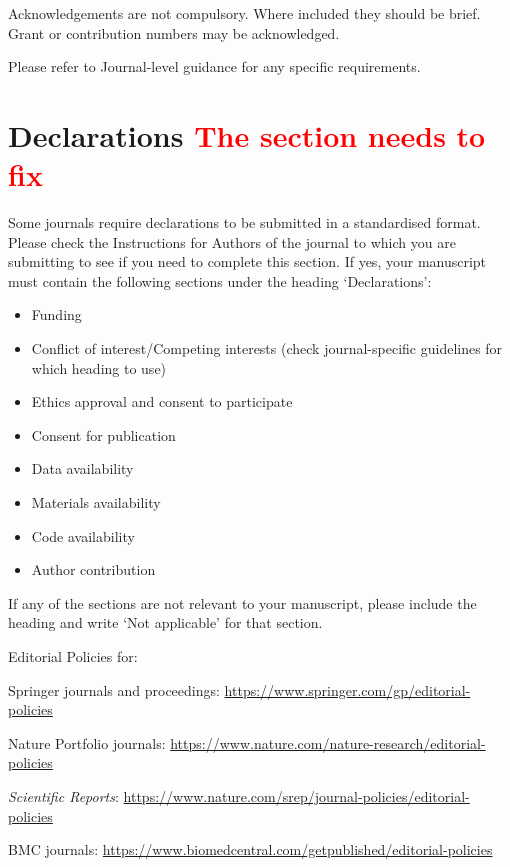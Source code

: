 \documentclass[pdflatex,sn-mathphys-num]{sn-jnl}%
\theoremstyle{thmstyleone}%
\theoremstyle{thmstyletwo}%
\theoremstyle{thmstylethree}%
\begin{document}
\newpage


Acknowledgements are not compulsory. Where included they should be brief. Grant or contribution numbers may be acknowledged.

Please refer to Journal-level guidance for any specific requirements.

\section*{Declarations \textcolor{red}{The section needs to fix}}

Some journals require declarations to be submitted in a standardised format. Please check the Instructions for Authors of the journal to which you are submitting to see if you need to complete this section. If yes, your manuscript must contain the following sections under the heading `Declarations':

\begin{itemize}
\item Funding
\item Conflict of interest/Competing interests (check journal-specific guidelines for which heading to use)
\item Ethics approval and consent to participate
\item Consent for publication
\item Data availability 
\item Materials availability
\item Code availability 
\item Author contribution
\end{itemize}

\noindent
If any of the sections are not relevant to your manuscript, please include the heading and write `Not applicable' for that section. 

\bigskip
\begin{flushleft}%
Editorial Policies for:

\bigskip\noindent
Springer journals and proceedings: \url{https://www.springer.com/gp/editorial-policies}

\bigskip\noindent
Nature Portfolio journals: \url{https://www.nature.com/nature-research/editorial-policies}

\bigskip\noindent
\textit{Scientific Reports}: \url{https://www.nature.com/srep/journal-policies/editorial-policies}

\bigskip\noindent
BMC journals: \url{https://www.biomedcentral.com/getpublished/editorial-policies}
\end{flushleft}
\end{document}
